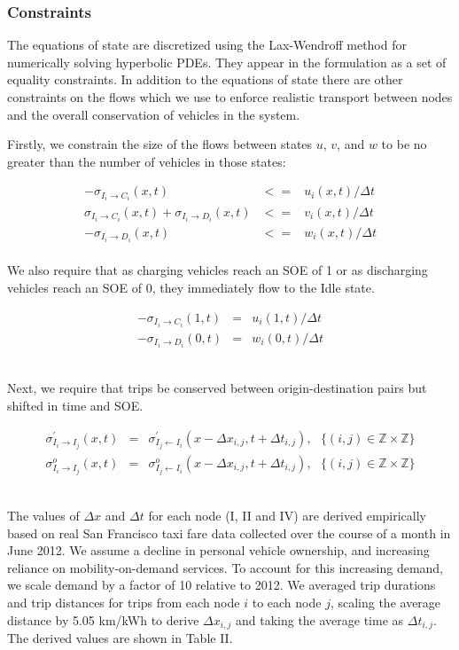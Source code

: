 \documentclass[journal]{IEEEtran}
\begin{document}
\subsubsection{Constraints}

The equations of state are discretized using the Lax-Wendroff method for numerically solving hyperbolic PDEs. They appear in the formulation as a set of equality constraints. In addition to the equations of state there are other constraints on the flows which we use to enforce realistic transport between nodes and the overall conservation of vehicles in the system. 

Firstly, we constrain the size of the flows between states $u$, $v$, and $w$ to be no greater than the number of vehicles in those states:

\begin{eqnarray*}
    -\sigma_{I_i \rightarrow C_i}(x,t) & <= & u_i(x,t) / \Delta t \\
    \sigma_{I_i \rightarrow C_i}(x,t) + \sigma_{I_i \rightarrow D_i}(x,t) & <= & v_i(x,t) / \Delta t \\
    -\sigma_{I_i \rightarrow D_i}(x,t) & <= & w_i(x,t) / \Delta t
\end{eqnarray*}
~\\ 
We also require that as charging vehicles reach an SOE of 1 or as discharging vehicles reach an SOE of 0, they immediately flow to the Idle state.

\begin{eqnarray*}
    -\sigma_{I_i \rightarrow C_i}(1,t) & = & u_i(1,t) / \Delta t \\
    -\sigma_{I_i \rightarrow D_i}(0,t) & = & w_i(0,t) / \Delta t
\end{eqnarray*}

~\\ 
Next, we require that trips be conserved between origin-destination pairs but shifted in time and SOE.

\begin{eqnarray*}
    \sigma_{I_i \rightarrow I_j}^\prime(x,t) & = & \sigma_{I_j \leftarrow I_i}^\prime(x - \Delta x_{i,j},t + \Delta t_{i,j}), ~~~ \{(i,j) \in \mathbb{Z} \times \mathbb{Z}\} \\
     \sigma_{I_i \rightarrow I_j}^o(x,t) & = & \sigma_{I_j \leftarrow I_i}^o(x - \Delta x_{i,j},t + \Delta t_{i,j}), ~~~ \{(i,j) \in \mathbb{Z} \times \mathbb{Z}\}
\end{eqnarray*}

~\\ 
The values of $\Delta x$ and $\Delta t$ for each node (I, II and IV) are derived empirically based on real San Francisco taxi fare data collected over the course of a month in June 2012. We assume a decline in personal vehicle ownership, and increasing reliance on mobility-on-demand services. To account for this increasing demand, we scale demand by a factor of 10 relative to 2012. We averaged trip durations and trip distances for trips from each node $i$ to each node $j$, scaling the average distance by 5.05 km/kWh to derive $\Delta x_{i,j}$ and taking the average time as $\Delta t_{i,j}$. The derived values are shown in Table II.
\end{document}
